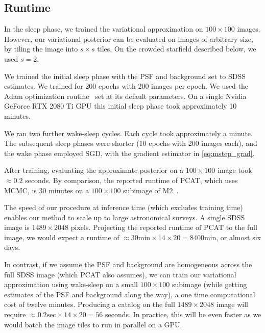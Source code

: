 \subsection{Runtime} 
\label{sec:runtime}
In the sleep phase, we trained the variational approximation on 
$100 \times 100$ images. 
However, our variational posterior can be evaluated on images of arbitrary size,
by tiling the image into $s \times s$ tiles. On the crowded starfield described below, we used $s = 2$. 

We trained the initial sleep phase 
with the PSF and background set to SDSS estimates. We trained for 200 epochs with 200 images per epoch. We used 
the Adam optimization routine~\cite{kingma2014adam} set at its default parameters. On a single Nvidia GeForce RTX 2080 Ti GPU 
this initial sleep phase took approximately 10 minutes. 

We ran two further wake-sleep cycles. Each cycle took approximately a minute. The subsequent sleep phases were shorter (10 epochs with 200 images each), and the wake phase employed SGD, with the gradient estimator in \eqref{eq:mstep_grad}. 

After training, evaluating the approximate posterior on a $100 \times 100$ 
image took $\approx 0.2$ seconds. By comparison, the reported runtime of PCAT, which uses MCMC, is 30 minutes on a $100 \times 100$ subimage of M2~\cite{Feder_2019}. 

The speed of our procedure at inference time (which excludes training time) enables our method to scale up to large astronomical surveys. A single SDSS image is $1489 \times 2048$ pixels. Projecting the reported runtime of PCAT to the full image, 
we would expect a runtime of 
$\approx 30\text{min} \times 14 \times 20 = 8400$min, or almost six days. 

In contrast, if we assume the PSF and background are homogeneous 
across the full SDSS image (which PCAT also assumes), we can 
train our variational approximation using wake-sleep 
on a small $100 \times 100$ subimage
(while getting estimates of the PSF and background along the way),
a one time computational cost of twelve minutes. 
Producing a catalog on the full $1489 \times 2048$ image will require 
$\approx 0.2\text{sec} \times 14 \times 20 = 56$ seconds. In practice, 
this will be even faster as we would batch the image tiles to run in parallel on a GPU. 


